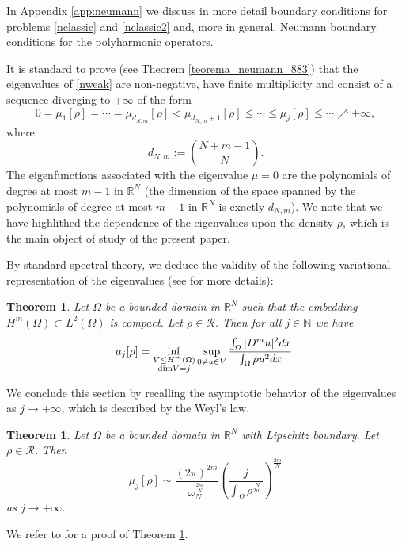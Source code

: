 \documentclass[11pt,a4paper]{amsart}
\numberwithin{equation}{section}
\newtheorem{thm}[equation]{Theorem}
\begin{document}
In Appendix \ref{app:neumann} we discuss in more detail boundary conditions for problems \eqref{nclassic} and \eqref{nclassic2} and, more in general, Neumann boundary conditions for the polyharmonic operators.




It is standard to prove (see Theorem \ref{teorema_neumann_883}) that the eigenvalues of \eqref{nweak} are non-negative, have finite multiplicity and consist of a sequence diverging to $+\infty$ of the form
$$
0=\mu_1[\rho]=\cdots=\mu_{d_{N,m}}[\rho]<\mu_{d_{N,m}+1}[\rho]\leq\cdots\leq\mu_j[\rho]\leq\cdots\nearrow+\infty,
$$
where
$$
d_{N,m}:=\binom{N+m-1}{N}.
$$
The eigenfunctions associated with the eigenvalue $\mu=0$ are the polynomials of degree at most $m-1$ in $\mathbb R^N$ (the dimension of the space spanned by the polynomials of degree at most $m-1$ in $\mathbb R^N$ is exactly $d_{N,m}$). We note that we have highlithed the dependence of the eigenvalues upon the density $\rho$, which is the main object of study of the present paper.

By  standard spectral theory, we deduce the validity of the following variational representation of the eigenvalues (see \cite[\S\,IV]{cohil} for more details):

\begin{thm}%
Let $\Omega$ be a bounded domain in $\mathbb R^N$ such that the embedding $H^m(\Omega)\subset L^2(\Omega)$ is compact. Let $\rho\in \mathcal R$. Then for all $j\in\mathbb N$ we have
\begin{equation}\label{minimax212}
\mu_{j}[\rho]=\inf_{\substack{V\leq H^m(\Omega)\\{\rm dim}V=j}}\sup_{\substack{0\ne u\in V}}\frac{\int_{\Omega}|D^mu|^2dx}{\int_{\Omega}\rho u^2dx}.
\end{equation}
\end{thm}

We conclude this section by recalling the asymptotic behavior of the eigenvalues as $j\rightarrow +\infty$, which is described by the Weyl's law.

\begin{thm}\label{weylthm}
Let $\Omega$ be a bounded domain in $\mathbb R^N$ with Lipschitz boundary. Let $\rho\in \mathcal R$. Then
\begin{equation}\label{weyl}
\mu_j[\rho]\sim\frac{(2\pi)^{2m}}{\omega_N^{\frac{2m}{N}}}\left(\frac{j}{\int_{\Omega}\rho^{\frac{N}{2m}}}\right)^{\frac{2m}{N}}
\end{equation}
as $j\rightarrow +\infty$.
\end{thm}
We refer to \cite{lapidus} for a proof of Theorem \ref{weylthm}.
\end{document}

